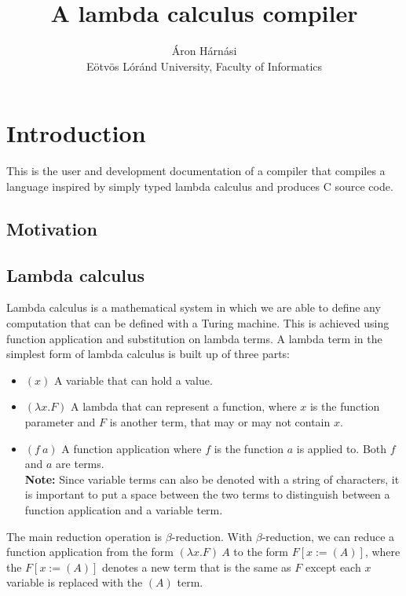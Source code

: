 \documentclass[12pt]{article}
\title{A lambda calculus compiler}
\author{Áron Hárnási \\
    \normalsize Eötvös Lóránd University, Faculty of Informatics}
\begin{document}
\linespread{1}
\maketitle
\pagebreak
\tableofcontents
\pagebreak

\section{Introduction}

This is the user and development documentation of a compiler that compiles a
language inspired by simply typed lambda calculus and produces C source code.

\subsection{Motivation} %

\subsection{Lambda calculus}

Lambda calculus is a mathematical system in which we are able to define any
computation that can be defined with a Turing machine. This is achieved using
function application and substitution on lambda terms. A lambda term in the
simplest form of lambda calculus is built up of three parts:
\begin{itemize}
    \item $(x)$ A variable that can hold a value.
    \item $(\lambda x. F)$ A lambda that can represent a function, where $x$
        is the function parameter and $F$ is another term, that may or 
        may not contain $x$.
    \item $(f\:a)$ A function application where $f$ is the function $a$ is
        applied to. Both $f$ and $a$ are terms. \\ \textbf{Note:} Since variable
        terms can also be denoted with a string of characters, it is important
        to put a space between the two terms to distinguish between a function
        application and a variable term.
\end{itemize}
The main reduction operation is $\beta$-reduction. With $\beta$-reduction, we
can reduce a function application from the form $(\lambda x. F)\:A$ to the
form $F[x := (A)]$, where the $F[x := (A)]$ denotes a new term that is the same
as $F$ except each $x$ variable is replaced with the $(A)$ term.
\end{document}

